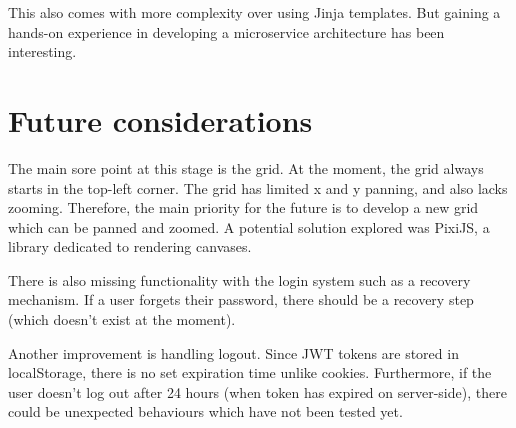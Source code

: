 This also comes with more complexity over using Jinja templates.
But gaining a hands-on experience in developing a microservice architecture has been interesting.

\section{Future considerations}\label{sec:additional-features-and-future-considerations}
The main sore point at this stage is the grid.
At the moment, the grid always starts in the top-left corner.
The grid has limited x and y panning, and also lacks zooming.
Therefore, the main priority for the future is to develop a new grid which can be panned and zoomed.
A potential solution explored was PixiJS, a library dedicated to rendering canvases.

There is also missing functionality with the login system such as a recovery mechanism.
If a user forgets their password, there should be a recovery step (which doesn't exist at the moment).

Another improvement is handling logout.
Since JWT tokens are stored in localStorage, there is no set expiration time unlike cookies.
Furthermore, if the user doesn't log out after 24 hours (when token has expired on server-side), there could be unexpected behaviours which have not been tested yet.